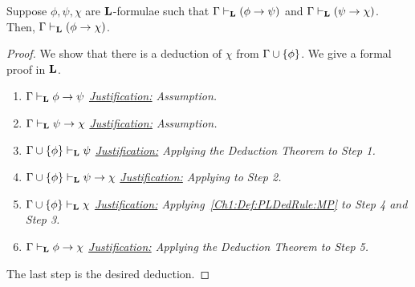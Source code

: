 \begin{boxcorollary}
    Suppose $\phi, \psi, \chi$ are $\mathbf{L}$-formulae such that $\Gamma \vdash_{\mathbf{L}} \left( \phi \to \psi \right)$ and $\Gamma \vdash_{\mathbf{L}} \left( \psi \to \chi \right)$. Then, $\Gamma \vdash_{\mathbf{L}} \left( \phi \to \chi \right)$.
\end{boxcorollary}
\begin{proof}
    We show that there is a deduction of $\chi$ from $\Gamma \cup \left\{ \phi \right\}$. We give a formal proof in $\mathbf{L}$.

    \begin{enumerate}
        \item $\Gamma \vdash_{\mathbf{L}} \phi \to \psi$
        \newline
        \textit{\underline{Justification:}
            Assumption.
        }

        \item $\Gamma \vdash_{\mathbf{L}} \psi \to \chi$
        \newline
        \textit{\underline{Justification:}
            Assumption.
        }

        \item $\Gamma \cup \left\{ \phi \right\} \vdash_{\mathbf{L}} \psi$
        \newline
        \textit{\underline{Justification:}
            Applying the Deduction Theorem to Step 1.
        }

        \item $\Gamma \cup \left\{ \phi \right\} \vdash_{\mathbf{L}} \psi \to \chi$
        \newline
        \textit{\underline{Justification:}
            Applying  to Step 2.
        }

        \item $\Gamma \cup \left\{ \phi \right\} \vdash_{\mathbf{L}} \chi$
        \newline
        \textit{\underline{Justification:}
            Applying~\ref{Ch1:Def:PLDedRule:MP} to Step 4 and Step 3.
        }

        \item $\Gamma \vdash_{\mathbf{L}} \phi \to \chi$
        \newline
        \textit{\underline{Justification:}
            Applying the Deduction Theorem to Step 5.
        }
    \end{enumerate}
    The last step is the desired deduction.
\end{proof}

